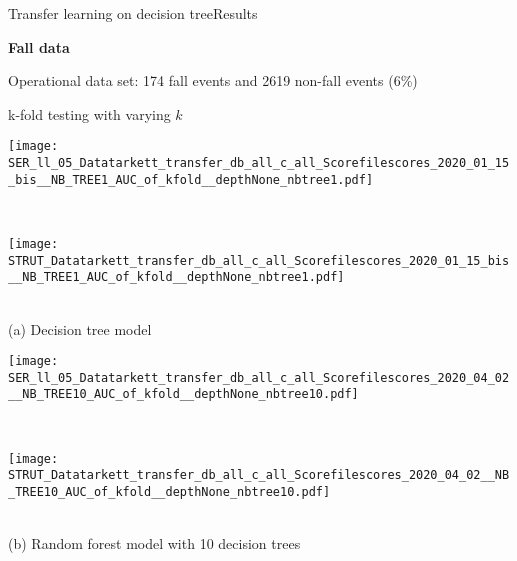 \begin{frame}{Transfer learning on decision tree}{Results}

\centering
\textbf{Fall data}

Operational data set: 174 fall events and 2619 non-fall events (6\%)

k-fold testing with varying $k$

\vspace{-0.2cm}
\renewcommand{\ratio}{0.65}
    \begin{minipage}[t]{0.49\linewidth}\vspace{0pt}
        \centering
        \begin{minipage}[t]{\ratio\linewidth}\vspace{0pt}
        \centerline{\texttt{[image: SER\_ll\_05\_Datatarkett\_transfer\_db\_all\_c\_all\_Scorefilescores\_2020\_01\_15\_bis\_\_NB\_TREE1\_AUC\_of\_kfold\_\_depthNone\_nbtree1.pdf]}}
        \end{minipage}\\
        \begin{minipage}[t]{\ratio\linewidth}\vspace{0cm}
        \centerline{\texttt{[image: STRUT\_Datatarkett\_transfer\_db\_all\_c\_all\_Scorefilescores\_2020\_01\_15\_bis\_\_NB\_TREE1\_AUC\_of\_kfold\_\_depthNone\_nbtree1.pdf]}}
        \end{minipage}\\
        {\small(a)\; Decision tree model}
    \end{minipage}
    \begin{minipage}[t]{0.49\linewidth}\vspace{0pt}
        \centering
        \begin{minipage}[t]{\ratio\linewidth}\vspace{0pt}
        \centerline{\texttt{[image: SER\_ll\_05\_Datatarkett\_transfer\_db\_all\_c\_all\_Scorefilescores\_2020\_04\_02\_\_NB\_TREE10\_AUC\_of\_kfold\_\_depthNone\_nbtree10.pdf]}}
        \end{minipage}\\
        \begin{minipage}[t]{\ratio\linewidth}\vspace{0cm}
        \centerline{\texttt{[image: STRUT\_Datatarkett\_transfer\_db\_all\_c\_all\_Scorefilescores\_2020\_04\_02\_\_NB\_TREE10\_AUC\_of\_kfold\_\_depthNone\_nbtree10.pdf]}}
        \end{minipage}\\
        {\small(b)\; Random forest model with 10 decision trees}
    \end{minipage}

\end{frame}

